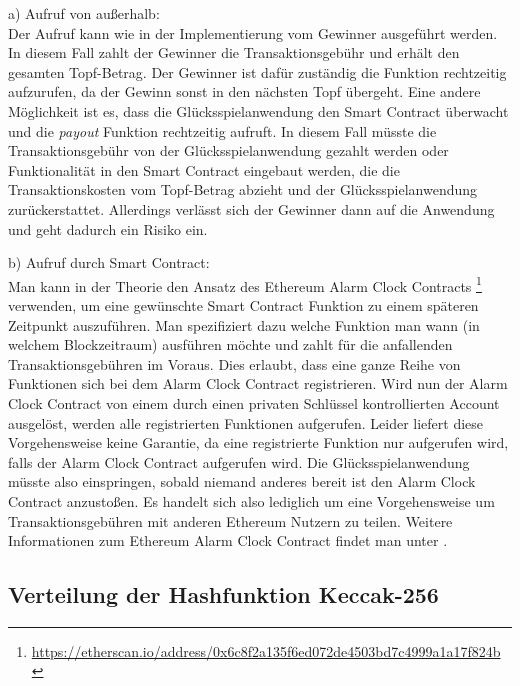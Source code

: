 a) Aufruf von außerhalb:\\
Der Aufruf kann wie in der Implementierung vom Gewinner ausgeführt werden. In diesem Fall zahlt der Gewinner die Transaktionsgebühr und erhält den gesamten Topf-Betrag. Der Gewinner ist dafür zuständig die Funktion rechtzeitig aufzurufen, da der Gewinn sonst in den nächsten Topf übergeht. Eine andere Möglichkeit ist es, dass die Glücksspielanwendung den Smart Contract überwacht und die \textit{payout} Funktion rechtzeitig aufruft. In diesem Fall müsste die Transaktionsgebühr von der Glücksspielanwendung gezahlt werden oder Funktionalität in den Smart Contract eingebaut werden, die die Transaktionskosten vom Topf-Betrag abzieht und der Glücksspielanwendung zurückerstattet. Allerdings verlässt sich der Gewinner dann auf die Anwendung und geht dadurch ein Risiko ein.

b) Aufruf durch Smart Contract:\\
Man kann in der Theorie den Ansatz des Ethereum Alarm Clock Contracts \footnote{\url{https://etherscan.io/address/0x6c8f2a135f6ed072de4503bd7c4999a1a17f824b}} verwenden, um eine gewünschte Smart Contract Funktion zu einem späteren Zeitpunkt auszuführen. Man spezifiziert dazu welche Funktion man wann (in welchem Blockzeitraum) ausführen möchte und zahlt für die anfallenden Transaktionsgebühren im Voraus. Dies erlaubt, dass eine ganze Reihe von Funktionen sich bei dem Alarm Clock Contract registrieren. Wird nun der Alarm Clock Contract von einem durch einen privaten Schlüssel kontrollierten Account ausgelöst, werden alle registrierten Funktionen aufgerufen. Leider liefert diese Vorgehensweise keine  Garantie, da eine registrierte Funktion nur aufgerufen wird, falls der Alarm Clock Contract aufgerufen wird. Die Glücksspielanwendung müsste also einspringen, sobald niemand anderes bereit ist den Alarm Clock Contract anzustoßen. Es handelt sich also lediglich um eine Vorgehensweise um Transaktionsgebühren mit anderen Ethereum Nutzern zu teilen. Weitere Informationen zum Ethereum Alarm Clock Contract findet man unter \cite{eth_alarm_clock}.

\subsection{Verteilung der Hashfunktion Keccak-256}\label{eth_distribution}

